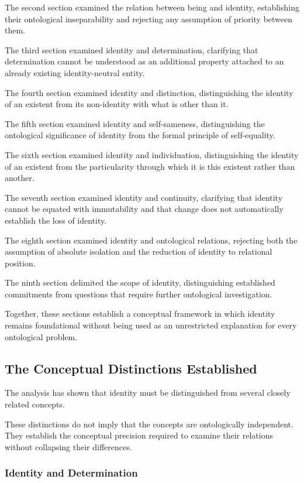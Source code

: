 The second section examined the relation between being and identity, establishing their ontological inseparability and rejecting any assumption of priority between them.

The third section examined identity and determination, clarifying that determination cannot be understood as an additional property attached to an already existing identity-neutral entity.

The fourth section examined identity and distinction, distinguishing the identity of an existent from its non-identity with what is other than it.

The fifth section examined identity and self-sameness, distinguishing the ontological significance of identity from the formal principle of self-equality.

The sixth section examined identity and individuation, distinguishing the identity of an existent from the particularity through which it is this existent rather than another.

The seventh section examined identity and continuity, clarifying that identity cannot be equated with immutability and that change does not automatically establish the loss of identity.

The eighth section examined identity and ontological relations, rejecting both the assumption of absolute isolation and the reduction of identity to relational position.

The ninth section delimited the scope of identity, distinguishing established commitments from questions that require further ontological investigation.

Together, these sections establish a conceptual framework in which identity remains foundational without being used as an unrestricted explanation for every ontological problem.

\subsection{The Conceptual Distinctions Established}

The analysis has shown that identity must be distinguished from several closely related concepts.

These distinctions do not imply that the concepts are ontologically independent. They establish the conceptual precision required to examine their relations without collapsing their differences.

\subsubsection{Identity and Determination}

